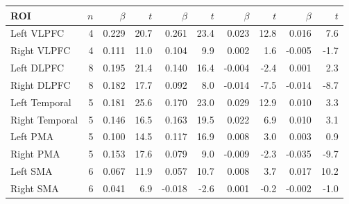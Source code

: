 \begin{tabular}{lr rrrr rrrr}
\toprule
ROI & $n$ & $\beta$ & $t$ & $\beta$ & $t$ & $\beta$ & $t$ & $\beta$ & $t$ \\
\midrule
Left VLPFC & 4 & 0.229 & 20.7 & 0.261 & 23.4 & 0.023 & 12.8 & 0.016 & 7.6 \\
Right VLPFC & 4 & 0.111 & 11.0 & 0.104 & 9.9 & 0.002 & 1.6 & -0.005 & -1.7 \\
Left DLPFC & 8 & 0.195 & 21.4 & 0.140 & 16.4 & -0.004 & -2.4 & 0.001 & 2.3 \\
Right DLPFC & 8 & 0.182 & 17.7 & 0.092 & 8.0 & -0.014 & -7.5 & -0.014 & -8.7 \\
Left Temporal & 5 & 0.181 & 25.6 & 0.170 & 23.0 & 0.029 & 12.9 & 0.010 & 3.3 \\
Right Temporal & 5 & 0.146 & 16.5 & 0.163 & 19.5 & 0.022 & 6.9 & 0.010 & 3.1 \\
Left PMA & 5 & 0.100 & 14.5 & 0.117 & 16.9 & 0.008 & 3.0 & 0.003 & 0.9 \\
Right PMA & 5 & 0.153 & 17.6 & 0.079 & 9.0 & -0.009 & -2.3 & -0.035 & -9.7 \\
Left SMA & 6 & 0.067 & 11.9 & 0.057 & 10.7 & 0.008 & 3.7 & 0.017 & 10.2 \\
Right SMA & 6 & 0.041 & 6.9 & -0.018 & -2.6 & 0.001 & -0.2 & -0.002 & -1.0 \\
\bottomrule
\end{tabular}
